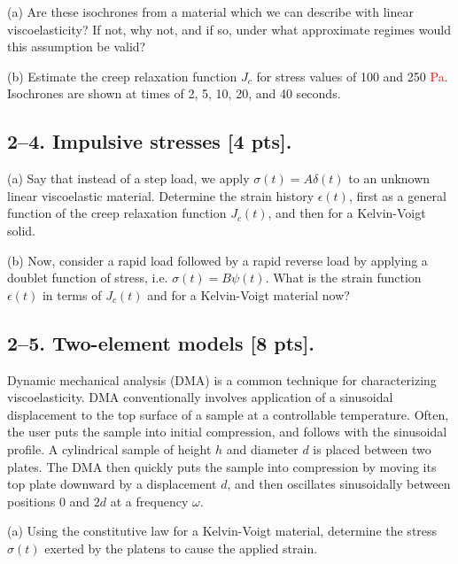 \vspace{-1em}
(a) Are these isochrones from a material which we can describe with linear viscoelasticity? If not, why not, and if so, under what approximate regimes would this assumption be valid? 

\medskip
(b) Estimate the creep relaxation function $J_c$ for stress values of 100 and 250 \textcolor{red}{Pa}. Isochrones are shown at times of 2, 5, 10, 20, and 40 seconds.   

\bigskip
\subsection*{2--4. \textbf{Impulsive stresses} [4 pts].}

(a) Say that instead of a step load, we apply $\sigma(t) = A \delta(t)$ to an unknown linear viscoelastic material. 
Determine the strain history $\epsilon(t)$, first as a general function of the creep relaxation function $J_c(t)$, and then for a Kelvin-Voigt solid. 

(b) Now, consider a rapid load followed by a rapid reverse load by applying a doublet function of stress, i.e. $\sigma(t) = B \psi(t)$. 
What is the strain function $\epsilon(t)$ in terms of $J_c(t)$ and for a Kelvin-Voigt material now? 


\bigskip
\subsection*{2--5. \textbf{Two-element models} [8 pts].}

Dynamic mechanical analysis (DMA) is a common technique for characterizing viscoelasticity. 
DMA conventionally involves application of a sinusoidal displacement to the top surface of a sample at a controllable temperature. 
Often, the user puts the sample into initial compression, and follows with the sinusoidal profile. 
A cylindrical sample of height $h$ and diameter $d$ is placed between two plates.
The DMA then quickly puts the sample into compression by moving its top plate downward by a displacement $d$, and then oscillates sinusoidally between positions $0$ and $2d$ at a frequency $\omega$.

\medskip
(a) Using the constitutive law for a Kelvin-Voigt material, determine the stress $\sigma(t)$ exerted by the platens to cause the applied strain. 

